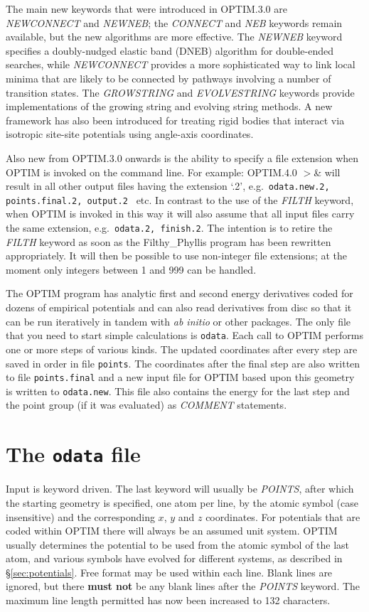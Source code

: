 \documentclass[12pt,a4paper,dvips]{article}
\begin{document}
The main new keywords that were introduced in
OPTIM.3.0 are {\it NEWCONNECT} and {\it NEWNEB};
the {\it CONNECT} and {\it NEB} keywords remain available, but the new algorithms
are more effective. The {\it NEWNEB} keyword specifies a
doubly-nudged elastic band (DNEB) algorithm for double-ended searches,\cite{TrygubenkoW04}
while {\it NEWCONNECT} provides a more sophisticated way to link local minima
that are likely to be connected by pathways involving a number of transition states.
The {\it GROWSTRING} and {\it EVOLVESTRING} keywords provide implementations of the
growing string and evolving string methods.\cite{ERV02,PetersHBC04}
A new framework has also been introduced for treating rigid bodies that interact
via isotropic site-site potentials using angle-axis coordinates.\cite{Wales05}

Also new from OPTIM.3.0 onwards is the ability to specify a file extension when OPTIM is invoked on the
command line. For example:
{\obeylines
OPTIM.4.0  \qquad $>$\& 
}
\noindent will result in all other output files having the 
extension `.2', e.g.~{\tt odata.new.2, points.final.2, output.2 } etc.
In contrast to the use of the {\it FILTH} keyword, when OPTIM is invoked in this way
it will also assume that all input files carry the same extension, e.g.~{\tt odata.2, finish.2}.
The intention is to retire the {\it FILTH} keyword as soon as the Filthy\_Phyllis program
has been rewritten appropriately. It will then be possible to use non-integer file extensions;
at the moment only integers between 1 and 999 can be handled.

The OPTIM program has analytic first and second energy derivatives coded for dozens of
empirical potentials and can also read derivatives from disc so that it can be run
iteratively in tandem with {\it ab initio\/} or other packages. 
The only file that you need to start simple calculations is {\tt odata}. 
Each call to OPTIM performs one or more steps of various kinds.
The updated coordinates after every step are saved in order
in file {\tt points}. The coordinates after the final step are also written to file
{\tt points.final} and a new input file for OPTIM based upon this geometry is written
to {\tt odata.new}. This file also contains the energy for the last step and
the point group (if it was evaluated) as {\it COMMENT\/} statements.

\section{The {\tt odata} file}
\label{sec:odata}
Input is keyword driven.
The last keyword will usually be {\it POINTS\/}, after which 
the starting geometry is specified, one atom per line, by the atomic symbol (case
insensitive) and the corresponding $x$, $y$ and $z$ coordinates. For potentials that
are coded within OPTIM there will always be an assumed unit system.
OPTIM usually determines the potential to be used from the atomic
symbol of the last atom, and various symbols have evolved for different systems, as
described in \S\ref{sec:potentials}. Free format may be used within each line. Blank lines are ignored,
but there {\bf must not} be any blank lines after the {\it POINTS\/} keyword.
The maximum line length permitted has now been increased to 132 characters.
\end{document}
